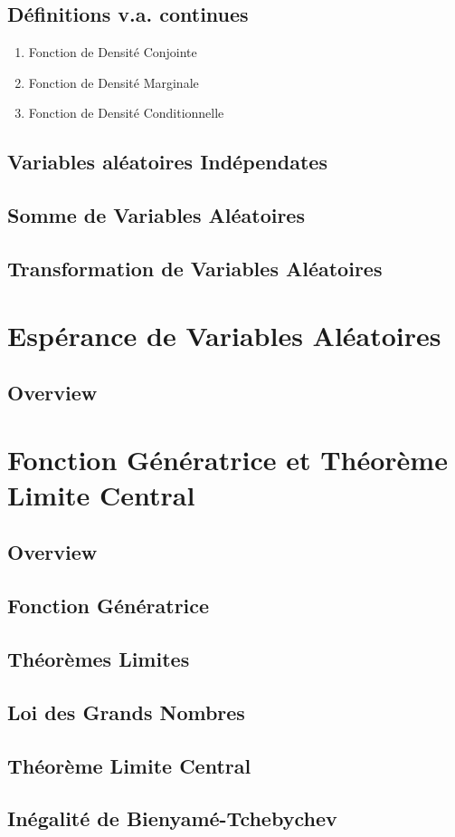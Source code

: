 \documentclass{article}
\begin{document}
\subsection{Définitions v.a. continues}

\begin{enumerate}
    \item Fonction de Densité Conjointe
    \item Fonction de Densité Marginale
    \item Fonction de Densité Conditionnelle
\end{enumerate}

\subsection{Variables aléatoires Indépendates}

\subsection{Somme de Variables Aléatoires}
\subsection{Transformation de Variables Aléatoires}

\section{Espérance de Variables Aléatoires}
\subsection*{Overview}

\section{Fonction Génératrice et Théorème Limite Central}
\subsection*{Overview}

\subsection{Fonction Génératrice}

\subsection{Théorèmes Limites}

\subsection{Loi des Grands Nombres}
\subsection{Théorème Limite Central}
\subsection{Inégalité de Bienyamé-Tchebychev}
\end{document}
